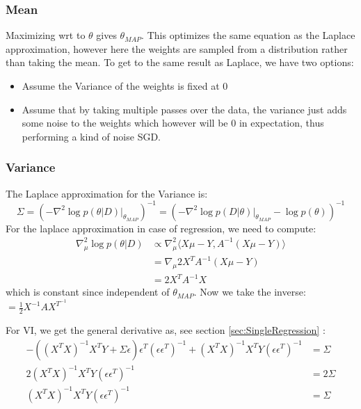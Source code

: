 \documentclass[a4paper]{scrartcl}
\begin{document}
    \subsubsection{Mean}
      Maximizing wrt to $\theta$ gives $\theta_{MAP}$. This optimizes the same
      equation as the Laplace approximation, however here the weights are sampled
      from a distribution rather than taking the mean. To get to the same result as Laplace, we have two options:
      \begin{itemize}
        \item Assume the Variance of the weights is fixed at 0
        \item Assume that by taking multiple passes over the data, the variance
        just adds some noise to the weights which however will be 0 in
        expectation, thus performing a kind of noise SGD.
      \end{itemize}
    \subsubsection{Variance}
      The Laplace approximation for the Variance is:
      \begin{equation}
        \Sigma = (- \nabla^2 \log p(\theta \vert D) \vert_{\theta_{MAP}})^{-1} = (- \nabla^2 \log p(D \vert \theta) \vert_{\theta_{MAP}} - \log p(\theta))^{-1}
      \end{equation}
      For the laplace approximation in case of regression, we need to compute:
      \begin{align}
        \nabla^2_{\mu} \log p(\theta \vert D)
        &\propto \nabla^2_{\mu} \langle X \mu - Y, A^{-1} (X \mu -Y) \rangle \\
        &= \nabla_{\mu} 2 X^T A^{-1} (X\mu - Y)\\
        &= 2 X^T A^{-1} X 
      \end{align} which is constant since independent of $\theta_{MAP}$. Now we take the inverse:
      $= \frac{1}{2}  X^{-1} A X^{T^{-1}}$

      For VI, we get the general derivative as, see section \ref{sec:SingleRegression} :
      \begin{align}
        -((X^T X)^{-1} X^T Y + \Sigma \epsilon) \epsilon^T (\epsilon \epsilon^T)^{-1} + (X^T X)^{-1} X^T Y (\epsilon \epsilon^T)^{-1}&= \Sigma\\
        2 (X^T X)^{-1} X^T Y (\epsilon \epsilon^T)^{-1} & = 2 \Sigma\\ %
         (X^T X)^{-1} X^T Y (\epsilon \epsilon^T)^{-1} &=  \Sigma
      \end{align}
\end{document}
